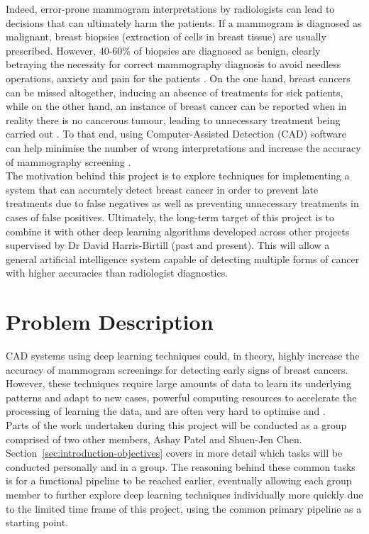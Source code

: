 Indeed, error-prone mammogram interpretations by radiologists can lead to decisions that can ultimately harm the patients. If a mammogram is diagnosed as malignant, breast biopsies (extraction of cells in breast tissue) are usually prescribed. However, 40-60\% of biopsies are diagnosed as benign, clearly betraying the necessity for correct mammography diagnosis to avoid needless operations, anxiety and pain for the patients \citep{Hepsag2017}. On the one hand, breast cancers can be missed altogether, inducing an absence of treatments for sick patients, while on the other hand, an instance of breast cancer can be reported when in reality there is no cancerous tumour, leading to unnecessary treatment being carried out \citep{Elter2009}. To that end, using Computer-Assisted Detection (CAD) software can help minimise the number of wrong interpretations and increase the accuracy of mammography screening \citep{Shen2017}.\\

The motivation behind this project is to explore techniques for implementing a system that can accurately detect breast cancer in order to prevent late treatments due to false negatives as well as preventing unnecessary treatments in cases of false positives. Ultimately, the long-term target of this project is to combine it with other deep learning algorithms developed across other projects supervised by Dr David Harris-Birtill (past and present). This will allow a general artificial intelligence system capable of detecting multiple forms of cancer with higher accuracies than radiologist diagnostics.\\


\section{Problem Description}
\label{sec:problem-description}

CAD systems using deep learning techniques could, in theory, highly increase the accuracy of mammogram screenings for detecting early signs of breast cancers. However, these techniques require large amounts of data to learn its underlying patterns and adapt to new cases, powerful computing resources to accelerate the processing of learning the data, and are often very hard to optimise and .\\

Parts of the work undertaken during this project will be conducted as a group comprised of two other members, Ashay Patel and Shuen-Jen Chen. Section~\ref{sec:introduction-objectives} covers in more detail which tasks will be conducted personally and in a group. The reasoning behind these common tasks is for a functional pipeline to be reached earlier, eventually allowing each group member to further explore deep learning techniques individually more quickly due to the limited time frame of this project, using the common primary pipeline as a starting point.

